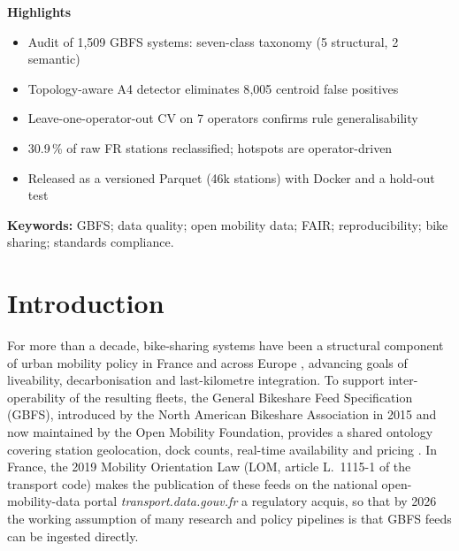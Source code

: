 \documentclass[11pt,a4paper]{article}
\newenvironment{highlights}{%
  \par\noindent\textsf{\bfseries\large Highlights}\par\smallskip
  \begin{itemize}[leftmargin=1.4em,itemsep=0.15em,topsep=0.2em]}{%
  \end{itemize}\par\medskip}
\begin{document}
\begin{highlights}
\item Audit of 1{,}509 GBFS systems: seven-class taxonomy (5 structural, 2 semantic)
\item Topology-aware A4 detector eliminates 8{,}005 centroid false positives
\item Leave-one-operator-out CV on 7 operators confirms rule generalisability
\item 30.9\,\% of raw FR stations reclassified; hotspots are operator-driven
\item Released as a versioned Parquet (46k stations) with Docker and a hold-out test
\end{highlights}

\noindent\textbf{Keywords:} GBFS; data quality; open mobility data; FAIR; reproducibility; bike sharing; standards compliance.

\section{Introduction}

For more than a decade, bike-sharing systems have been a structural
component of urban mobility policy in France and across Europe
\cite{Pucher2010Infrastructure}, advancing goals of liveability,
decarbonisation and last-kilometre integration. To
support inter-operability of the resulting fleets, the General Bikeshare
Feed Specification (GBFS), introduced by the North American Bikeshare
Association in 2015 and now maintained by the Open Mobility Foundation,
provides a shared ontology covering station geolocation, dock counts,
real-time availability and pricing
\cite{Mobi2024,OMF2023}. In France, the 2019 Mobility Orientation Law
\cite{LOM2019} (LOM, article L.~1115-1 of the transport code) makes
the publication of these feeds on the national open-mobility-data
portal \emph{transport.data.gouv.fr} \cite{PAN2017} a regulatory
acquis, so
that by 2026 the working assumption of many research and policy
pipelines is that GBFS feeds can be ingested directly.
\end{document}
